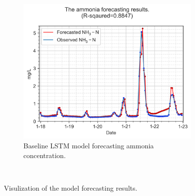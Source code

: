 \begin{figure}[!ht]
\begin{subfigure}[t]{0.75\textwidth}
      \includegraphics[width=\linewidth]{imgs/results/ammonia-colour-forecast-plot/00-LSTM_1_pred_Step1-obs-nh3.png}
      \caption{Baseline LSTM model forecasting ammonia concentration.} \label{fig:baseline-nh3-plot-lstm}
    \end{subfigure}\\
  \caption{Visulization of the model forecasting results.} \label{fig:baseline-plot-ammonia}
\end{figure}


